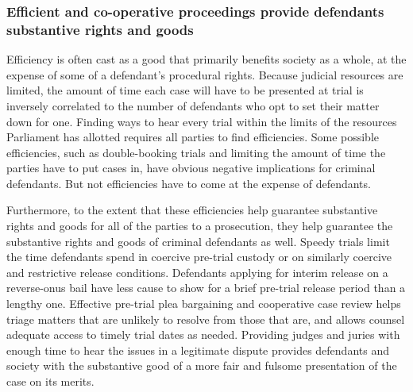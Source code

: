\subsubsection{Efficient and co-operative proceedings provide defendants substantive rights and goods}

Efficiency is often cast as a good that primarily benefits society as a whole, at the expense of some of a defendant's procedural rights. Because judicial resources are limited, the amount of time each case will have to be presented at trial is inversely correlated to the number of defendants who opt to set their matter down for one. Finding ways to hear every trial within the limits of the resources Parliament has allotted requires all parties to find efficiencies. Some possible efficiencies, such as double-booking trials and limiting the amount of time the parties have to put cases in, have obvious negative implications for criminal defendants. But not efficiencies have to come at the expense of defendants. 

Furthermore, to the extent that these efficiencies help guarantee substantive rights and goods for all of the parties to a prosecution, they help guarantee the substantive rights and goods of criminal defendants as well. Speedy trials limit the time defendants spend in coercive pre-trial custody or on similarly coercive and restrictive release conditions. Defendants applying for interim release on a reverse-onus bail have less cause to show for a brief pre-trial release period than a lengthy one. Effective pre-trial plea bargaining and cooperative case review helps triage matters that are unlikely to resolve from those that are, and allows counsel adequate access to timely trial dates as needed. Providing judges and juries with enough time to hear the issues in a legitimate dispute provides defendants and society with the substantive good of a more fair and fulsome presentation of the case on its merits.